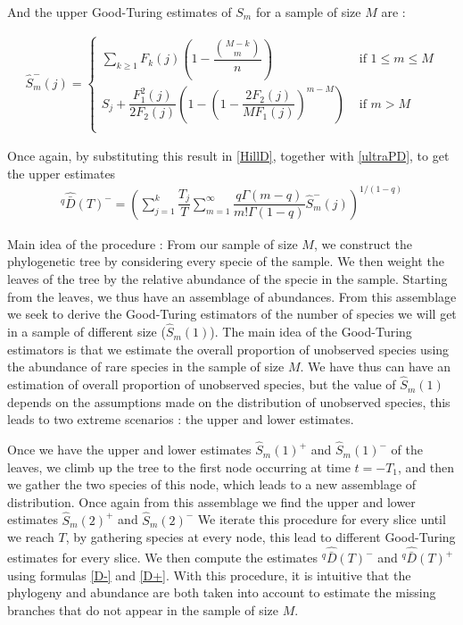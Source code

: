 \documentclass{article}
\begin{document}
And the upper Good-Turing estimates of $S_m$ for a sample of size $M$ are :

\begin{align}
 \widehat{S}^-_m(j)=\left\{ 
\begin{array}{ll}
      \sum_{k \geq 1} F_k(j)\left( 1- \dfrac{\binom{M-k}{m}}{n}\right) & \text{ if } 1\leq m \leq M \\
	  S_j +\dfrac{F_1^2(j)}{2 F_2(j)} \left( 1- \left(1-\dfrac{2 F_2(j)}{M F_1(j)} \right)^{m-M}\right)	& \text{ if } m > M \\ 
    \end{array} 
 \right.
 \end{align} 

Once again, by substituting this result in \eqref{HillD}, together with \eqref{ultraPD}, to get the upper estimates 
\begin{align} \label{D-}
 ^q \widehat{\bar{D}} (T)^- =\left( \sum_{j=1}^k \dfrac{T_j}{T} \sum_{m=1}^{\infty} \dfrac{q \Gamma (m-q)}{m!\Gamma (1-q)} \widehat{S}_m^-(j) \right)^{1/(1-q)}
 \end{align}
 
Main idea of the procedure :
From our sample of size $M$, we construct the phylogenetic tree by considering every specie of the sample. We then weight the leaves of the tree by the relative abundance of the specie in the sample. 
Starting from the leaves, we thus have an assemblage of abundances. From this assemblage we seek to derive the Good-Turing estimators of the number of species we will get in a sample of different size ($\widehat{S}_m(1)$). The main idea of the Good-Turing estimators is that we estimate the overall proportion of unobserved species using the abundance of rare species in the sample of size $M$.
We have thus can have an estimation of overall proportion of unobserved species, but the value of $\widehat{S}_m(1)$ depends on the assumptions made on the distribution of unobserved species, this leads to two extreme scenarios : the upper and lower estimates. 

Once we have the upper and lower estimates $\widehat{S}_m(1)^+$ and $\widehat{S}_m(1)^-$ of the leaves, we climb up the tree to the first node occurring at time $t=-T_1$, and then we gather the two species of this node, which leads to a new assemblage of distribution. Once again from this assemblage we find the upper and lower estimates $\widehat{S}_m(2)^+$ and $\widehat{S}_m(2)^-$
We iterate this procedure for every slice until we reach $T$, by gathering species at every node, this lead to different Good-Turing estimates for every slice. We then compute the estimates $^q \widehat{\bar{D}} (T)^-$ and $^q \widehat{\bar{D}} (T)^+$ using formulas \eqref{D-} and \eqref{D+}. 
With this procedure, it is intuitive that the phylogeny and abundance are both taken into account to estimate the missing branches that do not appear in the sample of size $M$.
\end{document}
